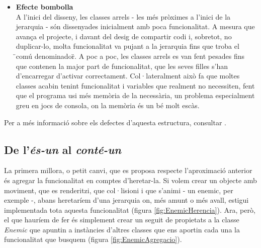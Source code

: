 \begin{itemize}
\begin{enumerate}
    \end{enumerate}
  \item {\bf Efecte bombolla} \hfill \\
    A l'inici del disseny, les classes arrels - les més pròximes a l'inici de la jerarquia - són dissenyades inicialment amb poca funcionalitat. A mesura que avança el projecte, i davant del desig de compartir codi i, sobretot, no duplicar-lo, molta funcionalitat va pujant a la jerarquia fins que troba el \"{}comú denominador\"{}. A poc a poc, les classes arrels es van fent pesades fins que contenen la major part de funcionalitat, que les seves filles s'han d'encarregar d'activar correctament. Col·lateralment això fa que moltes classes acabin tenint funcionalitat i variables que realment no necessiten, fent que el programa usi més memòria de la necessària, un problema especialment greu en jocs de consola, on la memòria és un bé molt escàs.
    
\end{itemize}

Per a més informació sobre els defectes d'aquesta estructura, consultar \cite{Wilson02}.

\subsection{De l'{\em és-un} al {\em conté-un}}


La primera millora, o petit canvi, que es proposa respecte l'aproximació anterior és agregar la funcionalitat en comptes d'heretar-la. Si volem crear un objecte amb moviment, que es renderitzi, que col·lisioni i que s'animi - un enemic, per exemple -, abans heretaríem d'una jerarquia on, més amunt o més avall, estigui implementada tota aquesta funcionalitat (figura \ref{fig:EnemicHerencia}). Ara, però, el que hauríem de fer és simplement crear un seguit de propietats a la classe {\em Enemic} que apuntin a instàncies d'altres classes que ens aportin cada una la funcionalitat que busquem (figura \ref{fig:EnemicAgregacio}).

